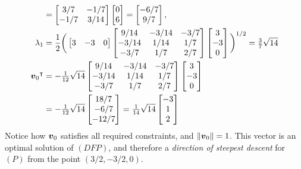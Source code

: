 \begin{example}
\begin{align*}
&= \begin{bmatrix} 3/7 & -1/7 \\ -1/7 & 3/14 \end{bmatrix} \begin{bmatrix} 0 \\ 6 \end{bmatrix} = \begin{bmatrix} -6/7 \\ 9/7 \end{bmatrix}, \\
\lambda_1 &= \frac{1}{2} \bigg( \begin{bmatrix} 3 & -3 & 0 \end{bmatrix} \begin{bmatrix} 9/14 & -3/14 & -3/7 \\ -3/14 & 1/14 & 1/7 \\ -3/7 & 1/7 & 2/7 \end{bmatrix} \begin{bmatrix} 3 \\ -3 \\ 0 \end{bmatrix} \bigg)^{1/2} = \tfrac{3}{7}\sqrt{14} \\
{\boldsymbol{v}_0}^\intercal &= -\tfrac{1}{12} \sqrt{14} \begin{bmatrix} 9/14 & -3/14 & -3/7 \\ -3/14 & 1/14 & 1/7 \\ -3/7 & 1/7 & 2/7 \end{bmatrix} \begin{bmatrix} 3 \\ -3 \\ 0 \end{bmatrix} \\
&= -\tfrac{1}{12}\sqrt{14} \begin{bmatrix} 18/7 \\ -6/7 \\ -12/7 \end{bmatrix} = \tfrac{1}{14}\sqrt{14} \begin{bmatrix} -3 \\ 1 \\ 2  \end{bmatrix}
\end{align*}
Notice how $\boldsymbol{v}_0$ satisfies all required constraints, and $\lVert \boldsymbol{v}_0 \rVert=1$.  This vector is an optimal solution of $(DFP)$, and therefore a \emph{direction of steepest descent} for $(P)$ from the point $(3/2, -3/2, 0)$.


\end{example}
